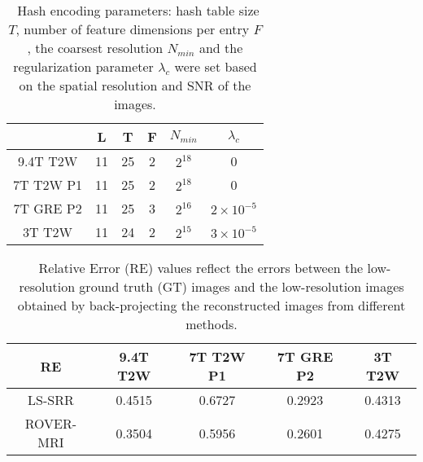 \documentclass[AMA,STIX2COL]{MRM}
\begin{document}


\vspace*{6pt}
\appendix
\renewcommand{\thetable}{S\arabic{table}}
\setcounter{table}{0} %

\begin{table}[h]
\caption{~Hash encoding parameters: hash table size $T$, number of feature dimensions per entry $F$, the coarsest resolution $N_{min}$ and the regularization parameter $\lambda_c$ were set based on the spatial resolution and SNR of the images. }
\label{tab1}
\begin{tabular}{c|c|c|c|c|c}
\hline
           & L  & T  & F & $N_{min}$                  & $\lambda_c$ \\ \hline
9.4T T2W & 11 & 25 & 2 & $2^{18}$ & 0      \\ \hline
7T T2W P1  & 11 & 25 & 2 & $2^{18}$ & 0      \\ \hline
7T GRE P2  & 11 & 25 & 3 & $2^{16}$ & $2\times10^{-5}$   \\ \hline
3T T2W     & 11 & 24 & 2 & $2^{15}$ & $3\times10^{-5}$   \\ \hline
\end{tabular}
\end{table}


\begin{table*}[h]
\caption{~Relative Error (RE) values reflect the errors between the low-resolution ground truth (GT) images and the low-resolution images obtained by back-projecting the reconstructed images from different methods.}
\label{tab2}
\centering
\begin{tabular}{c|cccc}
\hline
RE & 9.4T T2W & 7T T2W P1 & 7T GRE P2 & 3T T2W        \\ \hline
LS-SRR         &0.4515       &   0.6727       &    0.2923     & 0.4313 \\
ROVER-MRI   & 0.3504          &   0.5956        & 0.2601          & 0.4275 \\ \hline
\end{tabular}
\end{table*}
\end{document}
